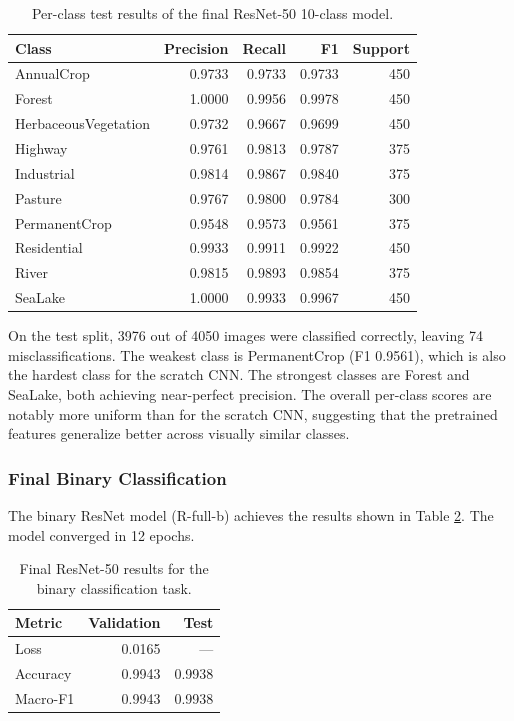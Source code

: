 \begin{table}[H]
\centering
\caption{Per-class test results of the final ResNet-50 10-class model.}
\label{tab:resnet_per_class}
\small
\begin{tabular}{lrrrr}
\toprule
Class & Precision & Recall & F1 & Support \\
\midrule
AnnualCrop            & 0.9733 & 0.9733 & 0.9733 & 450 \\
Forest                & 1.0000 & 0.9956 & 0.9978 & 450 \\
HerbaceousVegetation  & 0.9732 & 0.9667 & 0.9699 & 450 \\
Highway               & 0.9761 & 0.9813 & 0.9787 & 375 \\
Industrial            & 0.9814 & 0.9867 & 0.9840 & 375 \\
Pasture               & 0.9767 & 0.9800 & 0.9784 & 300 \\
PermanentCrop         & 0.9548 & 0.9573 & 0.9561 & 375 \\
Residential           & 0.9933 & 0.9911 & 0.9922 & 450 \\
River                 & 0.9815 & 0.9893 & 0.9854 & 375 \\
SeaLake               & 1.0000 & 0.9933 & 0.9967 & 450 \\
\bottomrule
\end{tabular}
\end{table}

On the test split, 3976 out of 4050 images were classified correctly, leaving
74 misclassifications. The weakest class is PermanentCrop (F1 0.9561), which is
also the hardest class for the scratch CNN. The strongest classes are Forest and
SeaLake, both achieving near-perfect precision. The overall per-class scores are
notably more uniform than for the scratch CNN, suggesting that the pretrained
features generalize better across visually similar classes.

\subsubsection{Final Binary Classification}

The binary ResNet model (R-full-b) achieves the results shown in Table
\ref{tab:resnet_final_binary}. The model converged in 12 epochs.

\begin{table}[H]
\centering
\caption{Final ResNet-50 results for the binary classification task.}
\label{tab:resnet_final_binary}
\begin{tabular}{lrr}
\toprule
Metric & Validation & Test \\
\midrule
Loss     & 0.0165 & --- \\
Accuracy & 0.9943 & 0.9938 \\
Macro-F1 & 0.9943 & 0.9938 \\
\bottomrule
\end{tabular}
\end{table}

